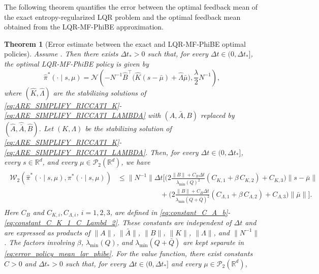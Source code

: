\documentclass[a4paper, 10pt, english, reqno]{amsart}
\newtheorem{theorem}{Theorem}[section]
\begin{document}
The following theorem quantifies the error between the optimal feedback mean of the exact entropy-regularized LQR problem and the optimal feedback mean obtained from the LQR-MF-PhiBE approximation.

\begin{theorem}[Error estimate between the exact and LQR-MF-PhiBE optimal policies]
\label{thm:policy_error_phibe_mkv}
Assume . Then there exists $\Delta t_*>0$ such that, for every $\Delta t\in(0,\Delta t_*]$, the optimal LQR-MF-PhiBE policy is given by
\[
  \hat\pi^*(\cdot\mid s,\mu)
  =
  \mathcal N\left(
    -N^{-1}\hat B^\top
    \bigl(
      \hat K(s-\bar\mu)+\hat\Lambda\bar\mu
    \bigr),
    \frac{\lambda}{2}N^{-1}
  \right),
\]
where $(\hat K,\hat\Lambda)$ are the stabilizing solutions of \eqref{eq:ARE_SIMPLIFY_RICCATI_K}-\eqref{eq:ARE_SIMPLIFY_RICCATI_LAMBDA} with $(A,\bar A,B)$ replaced by $(\hat A,\hat{\bar A},\hat B)$. Let $(K,\Lambda)$ be the stabilizing solution of \eqref{eq:ARE_SIMPLIFY_RICCATI_K}-\eqref{eq:ARE_SIMPLIFY_RICCATI_LAMBDA}. Then, for every $\Delta t\in(0,\Delta t_*]$, every $s\in\mathbb R^d$, and every $\mu\in\mathcal P_2(\mathbb R^d)$, we have
\begin{align}
\label{eq:error_policy_mean_lqr_phibe}
  \begin{aligned}
        \mathcal{W}_2(\hat \pi^*(\cdot\mid s,\mu),\pi^*(\cdot\mid s,\mu))
    &\le
    \|N^{-1}\|\Delta t 
    \Biggl[
    \Biggl(
      2\frac{\|B\|+C_B\Delta t}{\lambda_{\min}(Q)^2}
      \left(
         C_{K,1}
        +
        \beta \,C_{K,2}
      \right)
      +
      C_{K,3}
    \Biggr)
    \|s-\bar\mu\|
    \\
    &\qquad\qquad\qquad
    +
    \Biggl(
      2\frac{\|B\|+C_B\Delta t}
      {\lambda_{\min}(Q+\bar Q)^2}
      \left(
        C_{\Lambda,1}
        +
        \beta\, C_{\Lambda,2}
      \right)
      +
      C_{\Lambda,3}
    \Biggr)
    \|\bar\mu\|
    \Biggr].
  \end{aligned}
\end{align}
Here $C_B$ and $C_{K,i},C_{\Lambda,i}$, $i=1,2,3$, are defined in \eqref{eq:constant_C_A_b}-\eqref{eq:constant_C_K_1_C_Lambd_2}. These constants are independent of $\Delta t$ and are expressed as products of $\|A\|$, $\|\bar A\|$, $\|B\|$, $\|K\|$, $\|\Lambda\|$, and $\|N^{-1}\|$. The factors involving $\beta$, $\lambda_{\min}(Q)$, and $\lambda_{\min}(Q+\bar Q)$ are kept separate in \eqref{eq:error_policy_mean_lqr_phibe}. For the value function, there exist constants $C>0$ and $\Delta t_*>0$ such that, for every $\Delta t\in(0,\Delta t_*]$ and every $\mu\in\mathcal P_2(\mathbb R^d)$,

\end{theorem}
\end{document}
